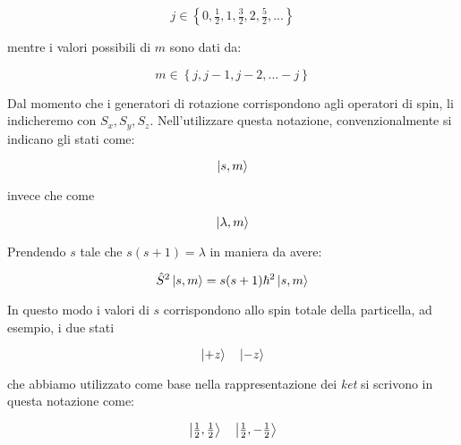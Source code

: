 	\begin{equation}
		j \in \left \{ 0, \tfrac{1}{2}, 1, \tfrac{3}{2}, 2, \tfrac{5}{2}, ... \right \}
	\end{equation}

mentre i valori possibili di $m$ sono dati da:

	\begin{equation}
		m \in \left \{ j, j-1, j-2, ... -j \right \}
	\end{equation}

Dal momento che i generatori di rotazione corrispondono agli operatori di spin, li indicheremo con $S_x, S_y, S_z$. Nell'utilizzare questa notazione, convenzionalmente si indicano gli stati come:

	\[
		\ket{s, m}
	\]

invece che come

	\[
		\ket{\lambda, m}
	\]

Prendendo $s$ tale che $s(s+1) = \lambda$ in maniera da avere:

	\begin{equation}
		\hat{S}^2 \ket{s, m} = s(s+1) \hbar^2 \ket{s, m}
	\end{equation}

In questo modo i valori di $s$ corrispondono allo spin totale della particella, ad esempio, i due stati

	\[
		\ket{+z} \quad \ket{-z}
	\]

che abbiamo utilizzato come base nella rappresentazione dei \textit{ket} si scrivono in questa notazione come:

	\[
		\ket{\tfrac{1}{2}, \tfrac{1}{2}} \quad \ket{\tfrac{1}{2}, - \tfrac{1}{2}}
	\]
